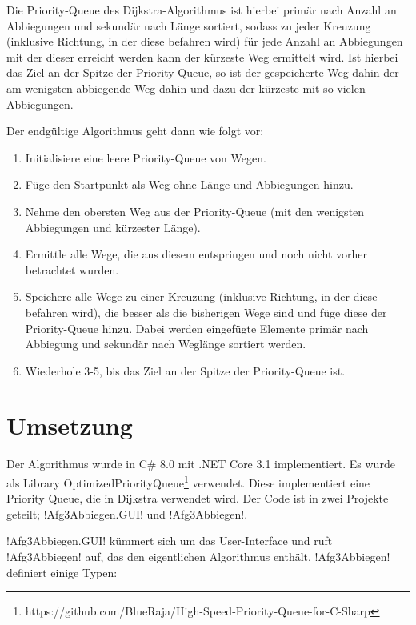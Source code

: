 \documentclass{article}
\begin{document}
Die Priority-Queue des Dijkstra-Algorithmus ist hierbei primär nach Anzahl an Abbiegungen und sekundär nach Länge sortiert, sodass zu jeder Kreuzung (inklusive Richtung, in der diese befahren wird) für jede Anzahl an Abbiegungen mit der dieser erreicht werden kann der kürzeste Weg ermittelt wird.
Ist hierbei das Ziel an der Spitze der Priority-Queue, so ist der gespeicherte Weg dahin der am wenigsten abbiegende Weg dahin und dazu der kürzeste mit so vielen Abbiegungen.

Der endgültige Algorithmus geht dann wie folgt vor:

\begin{enumerate}
    \item Initialisiere eine leere Priority-Queue von Wegen.
    \item Füge den Startpunkt als Weg ohne Länge und Abbiegungen hinzu.
    \item Nehme den obersten Weg aus der Priority-Queue (mit den wenigsten Abbiegungen und kürzester Länge).
    \item Ermittle alle Wege, die aus diesem entspringen und noch nicht vorher betrachtet wurden.
    \item Speichere alle Wege zu einer Kreuzung (inklusive Richtung, in der diese befahren wird), die besser als die bisherigen Wege sind und füge diese der Priority-Queue hinzu. Dabei werden eingefügte Elemente primär nach Abbiegung und sekundär nach Weglänge sortiert werden.
    \item Wiederhole 3-5, bis das Ziel an der Spitze der Priority-Queue ist.
\end{enumerate}

\section{Umsetzung}

Der Algorithmus wurde in C\# 8.0 mit .NET Core 3.1 implementiert.
Es wurde als Library OptimizedPriorityQueue\footnote{https://github.com/BlueRaja/High-Speed-Priority-Queue-for-C-Sharp} verwendet. Diese implementiert eine Priority Queue, die in Dijkstra verwendet wird.
Der Code ist in zwei Projekte geteilt;
!Afg3Abbiegen.GUI! und !Afg3Abbiegen!.

!Afg3Abbiegen.GUI! kümmert sich um das User-Interface und ruft !Afg3Abbiegen! auf, das den eigentlichen Algorithmus enthält.
!Afg3Abbiegen! definiert einige Typen:
\end{document}
